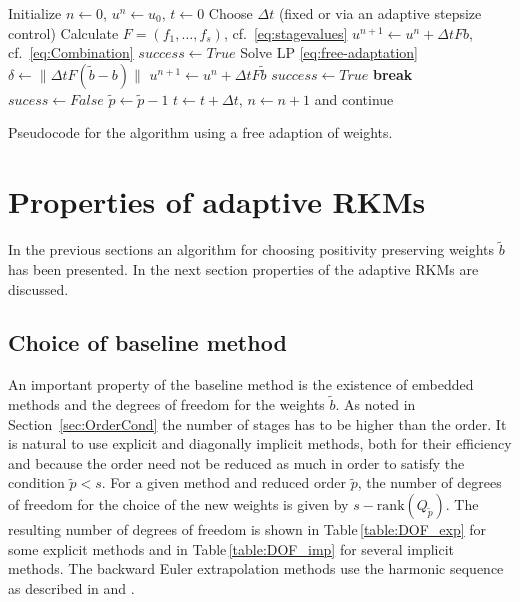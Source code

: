 \documentclass[a4paper]{article}
\numberwithin{equation}{section}
\theoremstyle{plain}
\theoremstyle{definition}
\numberwithin{theorem}{section}
\newcommand{\dt}{{\Delta t}}
\newcommand{\1}{\mathbbm{1}}
\newcommand{\bt}{\tilde{b}}
\newcommand{\pt}{{\tilde{p}}}
\newcommand{\todo}[1]{{\Large{\color{red}{#1}}}}
\begin{document}
\begin{algorithm}[ht]
\begin{algorithmic}[1]
\State Initialize $n \leftarrow 0$, $u^n \leftarrow u_0$, $t \leftarrow 0$
\State Choose $\Delta t$ (fixed or via an adaptive stepsize control)
\State Calculate $F = (f_1, \dots, f_s)$, cf.\ \eqref{eq:stagevalues}
\State $u^{n+1} \leftarrow u^n + \Delta t Fb$, cf.\ \eqref{eq:Combination}
	\State $success \leftarrow True$
\Else
	\State{$\pt \leftarrow p_{start}$}
	\While{$\pt \geq p_{min}$}
		\State Solve LP \eqref{eq:free-adaptation}
		 \todo{TODO: define these}
			\State $\delta \leftarrow \| \Delta t F(\bt-b)\|$
				\State $u^{n+1} \leftarrow u^n+\Delta t F \tilde b$
				\State $success \leftarrow True$
				\State \textbf{break}
			\EndIf
		\EndIf
		\If {$\pt = p_{min}$}
			\State $sucess \leftarrow False$
		\EndIf
		\State $\pt \leftarrow \pt - 1$
	\EndWhile
\EndIf
{}
	\State $t \leftarrow t + \dt$, $n \leftarrow n+1$ and continue
\Else
  \State \todo{TODO}
\EndIf
\EndWhile
\end{algorithmic}
\caption{Pseudocode for the algorithm using a free adaption of weights.}
\label{alg:Adaption}
\end{algorithm}



\section{Properties of adaptive RKMs}

In the previous sections an algorithm for choosing positivity preserving weights $\bt$ has been presented.
In the next section properties of the adaptive RKMs are discussed.

\subsection{Choice of baseline method} \label{sec:integration}
An important property of the baseline method is the existence of embedded methods and the degrees of freedom for the weights $\bt$.
As noted in Section~\ref{sec:OrderCond} the number of stages has to be higher than the order.
It is natural to use explicit and diagonally implicit methods, both for their efficiency and because
the order need not be reduced as much in order to satisfy the condition $\pt<s$.
For a given method and reduced order $\pt$, the number of degrees of freedom for the choice of the new weights
is given by $s-\mathrm{rank}(Q_{\pt})$. %
The resulting number of degrees of freedom is shown in Table\,\ref{table:DOF_exp}
for some explicit methods and in Table\,\ref{table:DOF_imp} for several implicit
methods. The backward Euler extrapolation methods use the harmonic sequence
as described in \cite[Section~II.9]{hairer_solving_1993} and
\cite[Section~IV.9]{hairer_solving_1996}.
\end{document}
